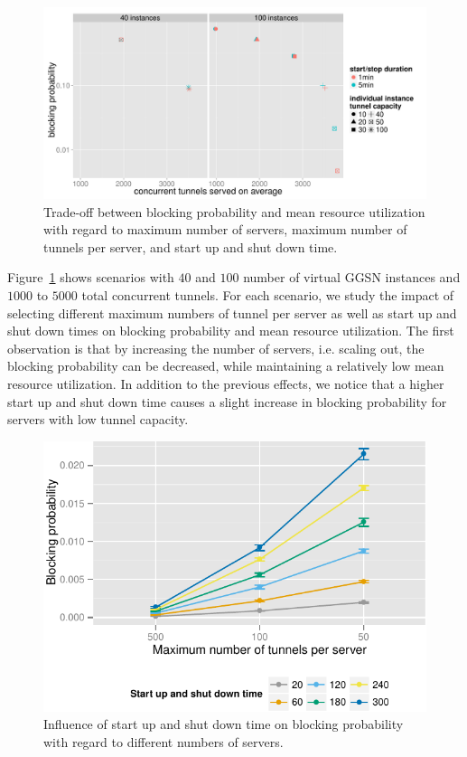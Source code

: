 \begin{figure}[htb]
  \centering
  \includegraphics[width=1.0\textwidth]{images/R-virtualized-startstop-tunnelusage-blocking-comparison.pdf}
  \caption{Trade-off between blocking probability and mean resource utilization with regard to maximum number of servers, maximum number of tunnels per server, and start up and shut down time.}
 \label{c4:fig:compare_util_block}
\end{figure}




Figure~\ref{c4:fig:compare_util_block} shows scenarios with $40$ and $100$ number of virtual \gls{GGSN} instances and  $1000$ to $5000$ total concurrent tunnels. For each scenario, we study the impact of selecting different maximum numbers of tunnel per server as well as start up and shut down times on blocking probability and mean resource utilization. The first observation is that by increasing the number of servers, i.e. scaling out, the blocking probability can be decreased, while maintaining a relatively low mean resource utilization. In addition to the previous effects, we notice that a higher start up and shut down time causes a slight increase in blocking probability for servers with low tunnel capacity.

\begin{figure}[htb]
  \centering
  \includegraphics[width=1.0\textwidth]{images/compare-maxinstances-block.pdf}
  \caption{Influence of start up and shut down time on blocking probability with regard to different numbers of servers.}
\label{c4:fig:compare_maxinstances_block}
\end{figure}


